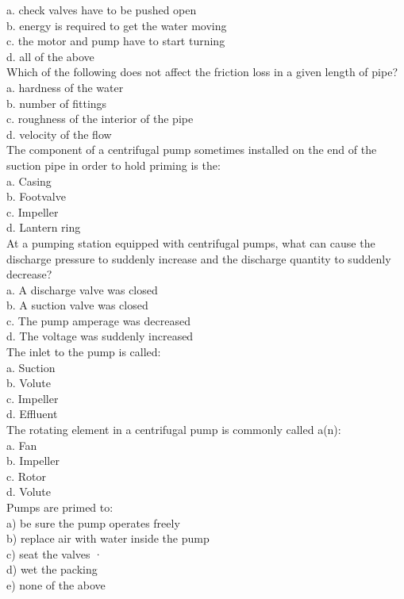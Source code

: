 a.	check valves have to be pushed open\\
b.	energy is required to get the water moving\\
c.	the motor and pump have to start turning\\
d.	all of the above\\
Which of the following does not affect the friction loss in a given length of pipe?\\
a.	hardness of the water\\
b.	number of fittings\\
c.	roughness of the interior of the pipe\\
d.	velocity of the flow\\
The component of a centrifugal pump sometimes installed on the end of the suction pipe in order to hold priming is the:\\
a. Casing\\
b. Footvalve\\
c. Impeller\\
d. Lantern ring\\
At a pumping station equipped with centrifugal pumps, what can cause the discharge pressure to suddenly increase and the discharge quantity to suddenly decrease?\\
a. A discharge valve was closed\\
b. A suction valve was closed\\
c. The pump amperage was decreased\\
d. The voltage was suddenly increased\\
The inlet to the pump is called:\\
a. Suction\\
b. Volute\\
c. Impeller\\
d. Effluent\\
The rotating element in a centrifugal pump is commonly called a(n):\\
a. Fan\\
b. Impeller\\
c. Rotor\\
d. Volute\\
Pumps are primed to:\\
a) be sure the pump operates freely\\
b) replace air with water inside the pump\\
c) seat the valves ·\\
d) wet the packing\\
e) none of the above\\
